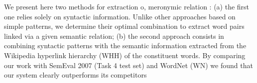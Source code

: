 We present here two methods for extraction o, meronymic relation : (a) the first one relies solely on syntactic information. Unlike other approaches based on simple patterns, we determine their optimal combination to extract word pairs linked via a given semantic relation; (b) the second approach consists in combining syntactic patterns with the semantic information extracted from the Wikipedia hyperlink hierarchy (WHH) of the constituent words. By comparing our work with SemEval 2007 (Task 4 test set) and WordNet (WN) we found that our system clearly outperforms its competitors
